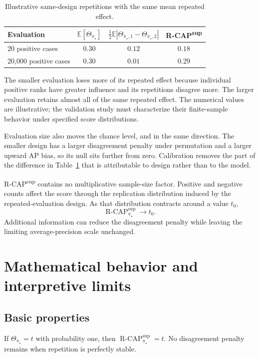 \documentclass[11pt]{article}
\newcommand{\E}{\mathbb{E}}
\newcommand{\RCAP}{\operatorname{R\text{-}CAP}^{\mathrm{sup}}_{\pi_\star}}
\theoremstyle{remark}
\begin{document}
\begin{table}[ht]
\centering
\caption{Illustrative same-design repetitions with the same mean repeated effect.}
\label{tab:illustration}
\begin{tabular}{@{}lccc@{}}
\toprule
Evaluation & $\E[\Theta_{\pi_\star}]$ & $\tfrac12\E|\Theta_{\pi_\star,1}-\Theta_{\pi_\star,2}|$ & R-CAP\textsuperscript{sup} \\
\midrule
20 positive cases & $0.30$ & $0.12$ & $0.18$ \\
20,000 positive cases & $0.30$ & $0.01$ & $0.29$ \\
\bottomrule
\end{tabular}
\end{table}

The smaller evaluation loses more of its repeated effect because individual positive ranks have greater influence and its repetitions disagree more. The larger evaluation retains almost all of the same repeated effect. The numerical values are illustrative; the validation study must characterize their finite-sample behavior under specified score distributions.

Evaluation size also moves the chance level, and in the same direction. The smaller design has a larger disagreement penalty under permutation and a larger upward AP bias, so its null sits further from zero. Calibration removes the part of the difference in Table~\ref{tab:illustration} that is attributable to design rather than to the model.

R-CAP\textsuperscript{sup} contains no multiplicative sample-size factor. Positive and negative counts affect the score through the replication distribution induced by the repeated-evaluation design. As that distribution contracts around a value $t_0$,
\[
\RCAP\longrightarrow t_0.
\]
Additional information can reduce the disagreement penalty while leaving the limiting average-precision scale unchanged.

\section{Mathematical behavior and interpretive limits}
\label{sec:properties}

\subsection{Basic properties}

If $\Theta_{\pi_\star}=t$ with probability one, then $\RCAP=t$. No disagreement penalty remains when repetition is perfectly stable.
\end{document}
